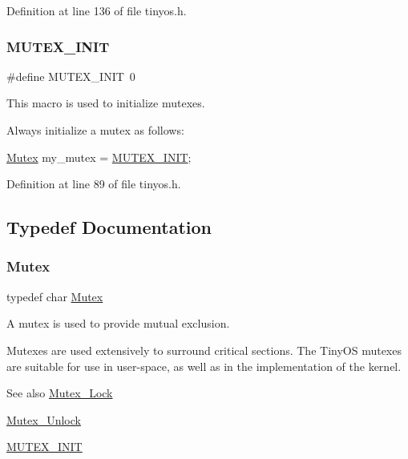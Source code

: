 Definition at line 136 of file tinyos.\+h.

\mbox{\label{group__syscalls_ga96be0bfc33e7e113099c7546798bec99}} 
\subsubsection{\texorpdfstring{M\+U\+T\+E\+X\+\_\+\+I\+N\+IT}{MUTEX\_INIT}}
{\footnotesize\ttfamily \#define M\+U\+T\+E\+X\+\_\+\+I\+N\+IT~0}



This macro is used to initialize mutexes. 

Always initialize a mutex as follows\+: 
\begin{DoxyCode}
\hyperlink{group__syscalls_gaef2ec62cae8e0031fd19fc8b91083ade}{Mutex} my\_mutex = \hyperlink{group__syscalls_ga96be0bfc33e7e113099c7546798bec99}{MUTEX\_INIT};
\end{DoxyCode}
 

Definition at line 89 of file tinyos.\+h.



\subsection{Typedef Documentation}
\mbox{\label{group__syscalls_gaef2ec62cae8e0031fd19fc8b91083ade}} 
\subsubsection{\texorpdfstring{Mutex}{Mutex}}
{\footnotesize\ttfamily typedef char \hyperlink{group__syscalls_gaef2ec62cae8e0031fd19fc8b91083ade}{Mutex}}



A mutex is used to provide mutual exclusion. 

Mutexes are used extensively to surround critical sections. The Tiny\+OS mutexes are suitable for use in user-\/space, as well as in the implementation of the kernel.

\begin{DoxySeeAlso}{See also}
\hyperlink{group__syscalls_ga1140be44df71d39edaf6a7262fb763ca}{Mutex\+\_\+\+Lock} 

\hyperlink{group__syscalls_ga0b98d0315d0931d0c28104c36dd559c9}{Mutex\+\_\+\+Unlock} 

\hyperlink{group__syscalls_ga96be0bfc33e7e113099c7546798bec99}{M\+U\+T\+E\+X\+\_\+\+I\+N\+IT} 
\end{DoxySeeAlso}


